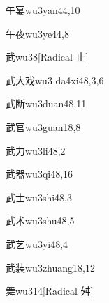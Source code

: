 \begin{entry}{午宴}{wu3yan4}{4,10}
\end{entry}

\begin{entry}{午夜}{wu3ye4}{4,8}
\end{entry}

\begin{entry}{武}{wu3}{8}[Radical 止]
\end{entry}

\begin{entry}{武大戏}{wu3 da4xi4}{8,3,6}
\end{entry}

\begin{entry}{武断}{wu3duan4}{8,11}
\end{entry}

\begin{entry}{武官}{wu3guan1}{8,8}
\end{entry}

\begin{entry}{武力}{wu3li4}{8,2}
\end{entry}

\begin{entry}{武器}{wu3qi4}{8,16}
\end{entry}

\begin{entry}{武士}{wu3shi4}{8,3}
\end{entry}

\begin{entry}{武术}{wu3shu4}{8,5}
\end{entry}

\begin{entry}{武艺}{wu3yi4}{8,4}
\end{entry}

\begin{entry}{武装}{wu3zhuang1}{8,12}
\end{entry}

\begin{entry}{舞}{wu3}{14}[Radical 舛]
\end{entry}

